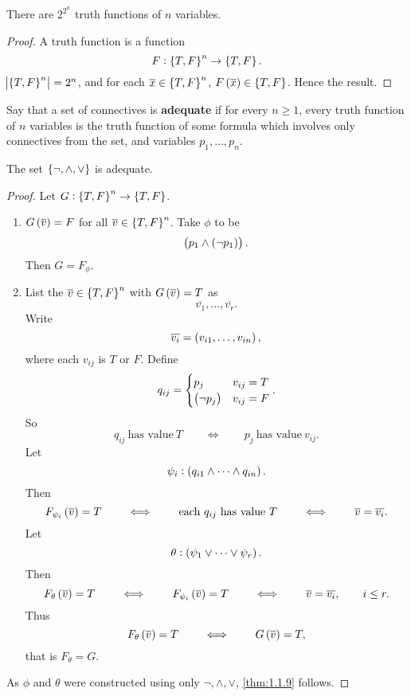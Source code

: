 \begin{lemma}
There are $ 2^{2^n} $ truth functions of $ n $ variables.
\end{lemma}

\begin{proof}
A truth function is a function
$$ F : \cbr{T, F}^n \to \cbr{T, F}. $$
$ \abs{\cbr{T, F}^n} = 2^n $, and for each $ \overline{x} \in \cbr{T, F}^n $, $ F\br{\overline{x}} \in \cbr{T, F} $. Hence the result.
\end{proof}

\pagebreak

\begin{definition}
Say that a set of connectives is \textbf{adequate} if for every $ n \ge 1 $, every truth function of $ n $ variables is the truth function of some formula which involves only connectives from the set, and variables $ p_1, \dots, p_n $.
\end{definition}

\begin{theorem}
\label{thm:1.1.9}
The set $ \cbr{\neg, \land, \lor} $ is adequate.
\end{theorem}

\begin{proof}
Let $ G : \cbr{T, F}^n \to \cbr{T, F} $.
\begin{enumerate}[leftmargin=0.5in, label=Case \arabic*.]
\item $ G\br{\overline{v}} = F $ for all $ \overline{v} \in \cbr{T, F}^n $. Take $ \phi $ to be
$$ \andb{p_1}{\notb{p_1}}. $$
Then $ G = F_\phi $.
\item List the $ \overline{v} \in \cbr{T, F}^n $ with $ G\br{\overline{v}} = T $ as
$$ \overline{v_1}, \dots, \overline{v_r}. $$
Write
$$ \overline{v_i} = \br{v_{i1}, \dots, v_{in}}, $$
where each $ v_{ij} $ is $ T $ or $ F $. Define
$$ q_{ij} =
\begin{cases}
p_j & v_{ij} = T \\
\notb{p_j} & v_{ij} = F
\end{cases}.
$$
So
$$ q_{ij} \ \text{has value} \ T \qquad \iff \qquad p_j \ \text{has value} \ v_{ij}. $$
Let
$$ \psi_i : \br{q_{i1} \land \dots \land q_{in}}. $$
Then
$$ F_{\psi_i}\br{\overline{v}} = T \qquad \iff \qquad \text{each} \ q_{ij} \ \text{has value} \ T \qquad \iff \qquad \overline{v} = \overline{v_i}. $$
Let
$$ \theta : \br{\psi_1 \lor \dots \lor \psi_r}. $$
Then
$$ F_\theta\br{\overline{v}} = T \qquad \iff \qquad F_{\psi_i}\br{\overline{v}} = T \qquad \iff \qquad \overline{v} = \overline{v_i}, \qquad i \le r. $$
Thus
$$ F_\theta\br{\overline{v}} = T \qquad \iff \qquad G\br{\overline{v}} = T, $$
that is $ F_\theta = G $.
\end{enumerate}
As $ \phi $ and $ \theta $ were constructed using only $ \neg, \land, \lor $, \ref{thm:1.1.9} follows.
\end{proof}

